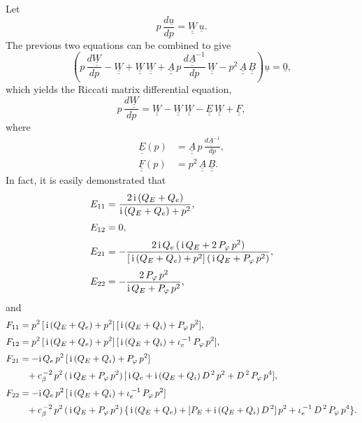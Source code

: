 \documentclass[12pt,prb,aps]{revtex4-1}
\begin{document}
Let
\begin{equation}\label{wdef}
 p\,\frac{d\underline{u}}{dp}=\underline{\underline{W}}\,\underline{u}.
\end{equation}
The previous two equations can be combined to give 
\begin{equation}
\left(p\,\frac{d\underline{\underline{W}}}{dp} - \underline{\underline{W}} 
+ \underline{\underline{W}}\,\underline{\underline{W}} + \underline{\underline{A}}\,p\,\frac{d\underline{\underline{A}}^{-1}}{dp}\,\underline{\underline{W}}- p^2\,\underline{\underline{A}}\,\underline{\underline{B}}\right)\underline{u} = \underline{0},
\end{equation}
which  yields the Riccati matrix differential equation, 
\begin{equation}\label{ricc}
p\,\frac{d\underline{\underline{W}}}{dp} = \underline{\underline{W}} - \underline{\underline{W}}\,\underline{\underline{W}} - \underline{\underline{E}}\,\underline{\underline{W}}
+\underline{\underline{F}},
\end{equation}
where 
\begin{align}
\underline{\underline{E}}(p) &= 
\underline{\underline{A}}\,p\,\frac{d\underline{\underline{A}}^{-1}}{dp},\\[0.5ex]
\underline{\underline{F}}(p)&= p^2\,\underline{\underline{A}}\,\underline{\underline{B}}.
\end{align}
In fact, it is easily demonstrated that
\begin{align}\label{ee1}
E_{11} &= \frac{2\,{\rm i}\,(Q_E+Q_e)}{{\rm i}\,(Q_E+ Q_e)+p^2},\\[0.5ex]
E_{12}&= 0,\\[0.5ex]
E_{21} &=-\frac{2\,{\rm i}\,Q_e\,(\,{\rm i}\,Q_E+2\,P_\varphi\,p^2)}{[\,{\rm i}\,(Q_E+Q_e)+p^2]\,(\,{\rm i}\,Q_E+P_\varphi\,p^2)},\\[0.5ex]
E_{22} &= -\frac{2\,P_\varphi\,p^2}{{\rm i}\,Q_E+ P_\varphi\,p^2},\label{ee4}
\end{align}
and
\begin{align}\label{f1}
F_{11} &= p^2\,[\,{\rm i}\,(Q_E+Q_e)+p^2]\,[\,{\rm i}\,(Q_E+Q_i) + P_\varphi\,p^2],\\[0.5ex]
F_{12} &= p^2\,[\,{\rm i}\,(Q_E+Q_e)+p^2]\,[\,{\rm i}\,(Q_E+Q_i) + \iota_e^{\,-1}\,P_\varphi\,p^2],\\[0.5ex]
F_{21} &=-{\rm i}\,Q_e\,p^2\,[\,{\rm i}\,(Q_E+Q_i)+P_\varphi\,p^2]\nonumber\\[0.5ex]
&\phantom{=} + c_\beta^{\,-2}\,p^2\,(\,{\rm i}\,Q_E+P_\varphi\,p^2)\,[\,{\rm i}\,Q_e+ {\rm i}\,(Q_E+Q_i)\,D^{\,2}\,p^2 + D^{\,2}\,P_\varphi\,p^4],\\[0.5ex]
F_{22} &=-{\rm i}\,Q_e\,p^2\,[\,{\rm i}\,(Q_E+Q_i)+\iota_e^{\,-1}\,P_\varphi\,p^2]\nonumber\\[0.5ex] 
&\phantom{=}+c_\beta^{\,-2}\,p^2\,(\,{\rm i}\,Q_E+P_\varphi\,p^2)\,\{\,{\rm i}\,(Q_E+Q_e) + [P_E +{\rm i}\,(Q_E + Q_i)\,D^{\,2}]\,p^2 + \iota_e^{\,-1}\,D^{\,2}\,P_\varphi\,p^4\}.\label{f4}
\end{align}
\end{document}
